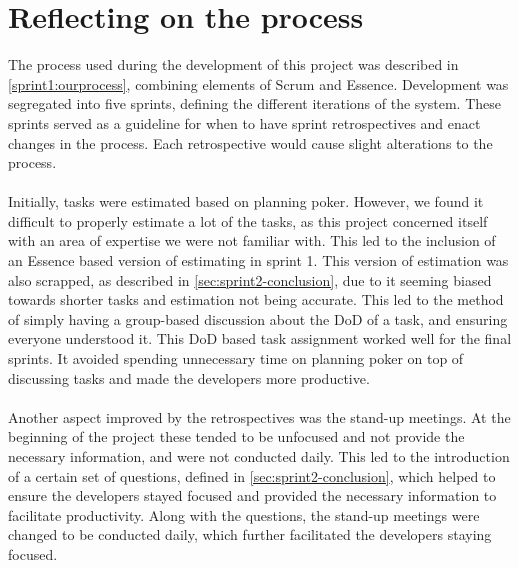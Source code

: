 \section{Reflecting on the process}
The process used during the development of this project was described in \autoref{sprint1:ourprocess}, combining elements of Scrum and Essence.
Development was segregated into five sprints, defining the different iterations of the system.
These sprints served as a guideline for when to have sprint retrospectives and enact changes in the process.
Each retrospective would cause slight alterations to the process.
\\\\
Initially, tasks were estimated based on planning poker.
However, we found it difficult to properly estimate a lot of the tasks, as this project concerned itself with an area of expertise we were not familiar with.
This led to the inclusion of an Essence based version of estimating in sprint 1.
This version of estimation was also scrapped, as described in \autoref{sec:sprint2-conclusion}, due to it seeming biased towards shorter tasks and estimation not being accurate.
This led to the method of simply having a group-based discussion about the DoD of a task, and ensuring everyone understood it.
This DoD based task assignment worked well for the final sprints.
It avoided spending unnecessary time on planning poker on top of discussing tasks and made the developers more productive.
\\\\
Another aspect improved by the retrospectives was the stand-up meetings.
At the beginning of the project these tended to be unfocused and not provide the necessary information, and were not conducted daily.
This led to the introduction of a certain set of questions, defined in \autoref{sec:sprint2-conclusion}, which helped to ensure the developers stayed focused and provided the necessary information to facilitate productivity.
Along with the questions, the stand-up meetings were changed to be conducted daily, which further facilitated the developers staying focused.
\\\\
